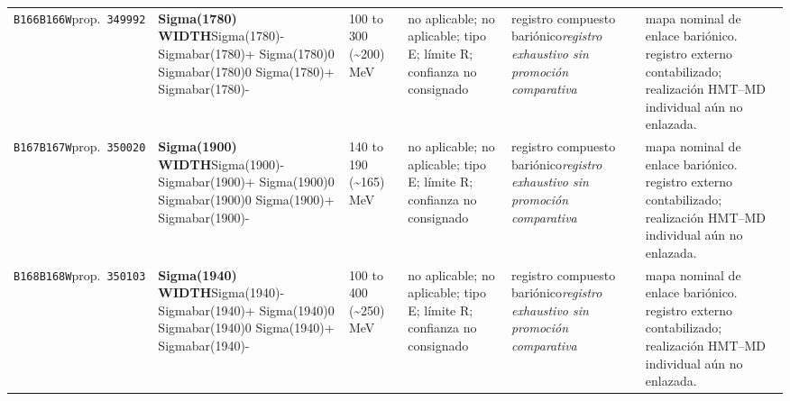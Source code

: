 \begin{landscape}
\begin{longtable}{L{1.85cm}L{4.45cm}L{2.35cm}L{4.05cm}L{3.35cm}L{7.15cm}}
\texttt{B166}\newline \texttt{B166W}\newline prop.\ \texttt{349992} & \textbf{Sigma(1780) WIDTH}\newline Sigma(1780)- \textbar{}\allowbreak{} Sigmabar(1780)+ \textbar{}\allowbreak{} Sigma(1780)0 \textbar{}\allowbreak{} Sigmabar(1780)0 \textbar{}\allowbreak{} Sigma(1780)+ \textbar{}\allowbreak{} Sigmabar(1780)- & 100 to 300 (\textasciitilde{}200)\,MeV & no aplicable; no aplicable; tipo E; límite R; confianza no consignado & registro compuesto bariónico\newline \emph{registro exhaustivo sin promoción comparativa} & mapa nominal de enlace bariónico. registro externo contabilizado; realización HMT--MD individual aún no enlazada. \\
\texttt{B167}\newline \texttt{B167W}\newline prop.\ \texttt{350020} & \textbf{Sigma(1900) WIDTH}\newline Sigma(1900)- \textbar{}\allowbreak{} Sigmabar(1900)+ \textbar{}\allowbreak{} Sigma(1900)0 \textbar{}\allowbreak{} Sigmabar(1900)0 \textbar{}\allowbreak{} Sigma(1900)+ \textbar{}\allowbreak{} Sigmabar(1900)- & 140 to 190 (\textasciitilde{}165)\,MeV & no aplicable; no aplicable; tipo E; límite R; confianza no consignado & registro compuesto bariónico\newline \emph{registro exhaustivo sin promoción comparativa} & mapa nominal de enlace bariónico. registro externo contabilizado; realización HMT--MD individual aún no enlazada. \\
\texttt{B168}\newline \texttt{B168W}\newline prop.\ \texttt{350103} & \textbf{Sigma(1940) WIDTH}\newline Sigma(1940)- \textbar{}\allowbreak{} Sigmabar(1940)+ \textbar{}\allowbreak{} Sigma(1940)0 \textbar{}\allowbreak{} Sigmabar(1940)0 \textbar{}\allowbreak{} Sigma(1940)+ \textbar{}\allowbreak{} Sigmabar(1940)- & 100 to 400 (\textasciitilde{}250)\,MeV & no aplicable; no aplicable; tipo E; límite R; confianza no consignado & registro compuesto bariónico\newline \emph{registro exhaustivo sin promoción comparativa} & mapa nominal de enlace bariónico. registro externo contabilizado; realización HMT--MD individual aún no enlazada. \\

\end{longtable}
\end{landscape}
